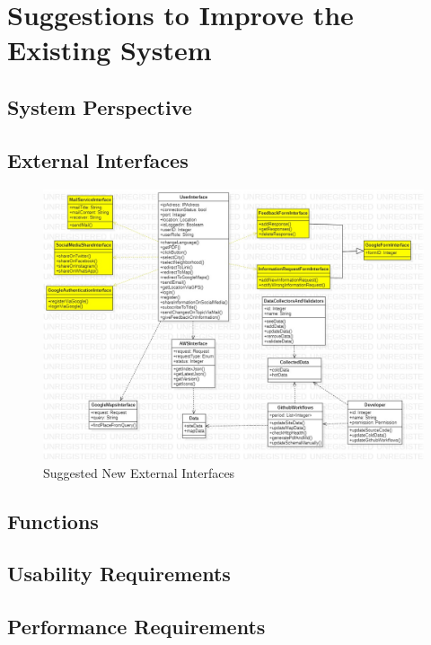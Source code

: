 \section{Suggestions to Improve the Existing System}

\subsection{System Perspective}

\subsection{External Interfaces}

\vfill
\begin{figure}[H]
  \centering
  \includegraphics[width=\linewidth]{img/external-interfaces-s4.jpg}
  \caption{Suggested New External Interfaces}
\end{figure}
\vfill
\newpage

\subsection{Functions}

\subsection{Usability Requirements}

\subsection{Performance Requirements}

